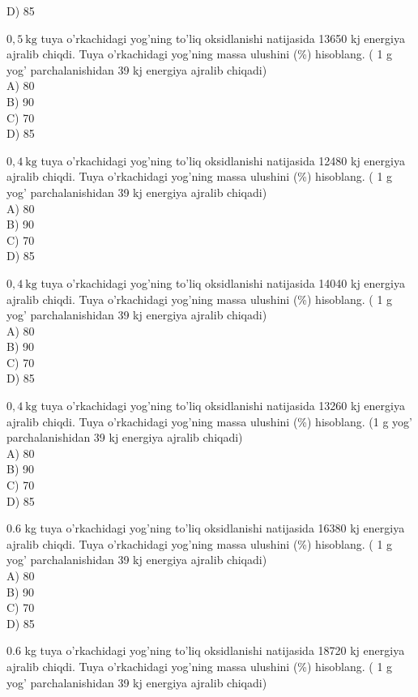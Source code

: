 D) 85
  \item $0,5 \mathrm{~kg}$ tuya o'rkachidagi yog'ning to'liq oksidlanishi natijasida 13650 kj energiya ajralib chiqdi. Tuya o'rkachidagi yog'ning massa ulushini (\%) hisoblang. ( 1 g yog' parchalanishidan 39 kj energiya ajralib chiqadi)\\
A) 80\\
B) 90\\
C) 70\\
D) 85
  \item $0,4 \mathrm{~kg}$ tuya o'rkachidagi yog'ning to'liq oksidlanishi natijasida 12480 kj energiya ajralib chiqdi. Tuya o'rkachidagi yog'ning massa ulushini (\%) hisoblang. ( 1 g yog' parchalanishidan 39 kj energiya ajralib chiqadi)\\
A) 80\\
B) 90\\
C) 70\\
D) 85
  \item $0,4 \mathrm{~kg}$ tuya o'rkachidagi yog'ning to'liq oksidlanishi natijasida 14040 kj energiya ajralib chiqdi. Tuya o'rkachidagi yog'ning massa ulushini (\%) hisoblang. ( 1 g yog' parchalanishidan 39 kj energiya ajralib chiqadi)\\
A) 80\\
B) 90\\
C) 70\\
D) 85
  \item $0,4 \mathrm{~kg}$ tuya o'rkachidagi yog'ning to'liq oksidlanishi natijasida 13260 kj energiya ajralib chiqdi. Tuya o'rkachidagi yog'ning massa ulushini (\%) hisoblang. (1 g yog'\\
parchalanishidan 39 kj energiya ajralib chiqadi)\\
A) 80\\
B) 90\\
C) 70\\
D) 85
  \item 0.6 kg tuya o'rkachidagi yog'ning to'liq oksidlanishi natijasida 16380 kj energiya ajralib chiqdi. Tuya o'rkachidagi yog'ning massa ulushini (\%) hisoblang. ( 1 g yog' parchalanishidan 39 kj energiya ajralib chiqadi)\\
A) 80\\
B) 90\\
C) 70\\
D) 85
  \item 0.6 kg tuya o'rkachidagi yog'ning to'liq oksidlanishi natijasida 18720 kj energiya ajralib chiqdi. Tuya o'rkachidagi yog'ning massa ulushini (\%) hisoblang. ( 1 g yog' parchalanishidan 39 kj energiya ajralib chiqadi)\\
